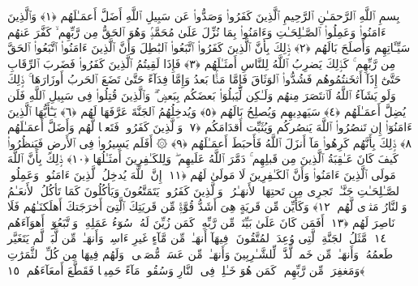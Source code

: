 
  
    
  
    
    

\nopagebreak
  بِسمِ ٱللَّهِ ٱلرَّحمَـٰنِ ٱلرَّحِيمِ
  ٱلَّذِينَ كَفَرُوا۟ وَصَدُّوا۟ عَن سَبِيلِ ٱللَّهِ أَضَلَّ أَعمَـٰلَهُم ﴿١﴾
 وَٱلَّذِينَ ءَامَنُوا۟ وَعَمِلُوا۟ ٱلصَّـٰلِحَـٰتِ وَءَامَنُوا۟ بِمَا نُزِّلَ عَلَىٰ مُحَمَّدٍۢ وَهُوَ ٱلحَقُّ مِن رَّبِّهِم ۙ كَفَّرَ عَنهُم سَيِّـَٔاتِهِم وَأَصلَحَ بَالَهُم ﴿٢﴾
 ذَٟلِكَ بِأَنَّ ٱلَّذِينَ كَفَرُوا۟ ٱتَّبَعُوا۟ ٱلبَٰطِلَ وَأَنَّ ٱلَّذِينَ ءَامَنُوا۟ ٱتَّبَعُوا۟ ٱلحَقَّ مِن رَّبِّهِم ۚ كَذَٟلِكَ يَضرِبُ ٱللَّهُ لِلنَّاسِ أَمثَـٰلَهُم ﴿٣﴾
 فَإِذَا لَقِيتُمُ ٱلَّذِينَ كَفَرُوا۟ فَضَربَ ٱلرِّقَابِ حَتَّىٰٓ إِذَآ أَثخَنتُمُوهُم فَشُدُّوا۟ ٱلوَثَاقَ فَإِمَّا مَنًّۢا بَعدُ وَإِمَّا فِدَآءً حَتَّىٰ تَضَعَ ٱلحَربُ أَوزَارَهَا ۚ ذَٟلِكَ وَلَو يَشَآءُ ٱللَّهُ لَٱنتَصَرَ مِنهُم وَلَـٰكِن لِّيَبلُوَا۟ بَعضَكُم بِبَعضٍۢ ۗ وَٱلَّذِينَ قُتِلُوا۟ فِى سَبِيلِ ٱللَّهِ فَلَن يُضِلَّ أَعمَـٰلَهُم ﴿٤﴾
 سَيَهدِيهِم وَيُصلِحُ بَالَهُم ﴿٥﴾
 وَيُدخِلُهُمُ ٱلجَنَّةَ عَرَّفَهَا لَهُم ﴿٦﴾
 يَـٰٓأَيُّهَا ٱلَّذِينَ ءَامَنُوٓا۟ إِن تَنصُرُوا۟ ٱللَّهَ يَنصُركُم وَيُثَبِّت أَقدَامَكُم ﴿٧﴾
 وَٱلَّذِينَ كَفَرُوا۟ فَتَعسًۭا لَّهُم وَأَضَلَّ أَعمَـٰلَهُم ﴿٨﴾
 ذَٟلِكَ بِأَنَّهُم كَرِهُوا۟ مَآ أَنزَلَ ٱللَّهُ فَأَحبَطَ أَعمَـٰلَهُم ﴿٩﴾
 ۞ أَفَلَم يَسِيرُوا۟ فِى ٱلأَرضِ فَيَنظُرُوا۟ كَيفَ كَانَ عَـٰقِبَةُ ٱلَّذِينَ مِن قَبلِهِم ۚ دَمَّرَ ٱللَّهُ عَلَيهِم ۖ وَلِلكَـٰفِرِينَ أَمثَـٰلُهَا ﴿١٠﴾
 ذَٟلِكَ بِأَنَّ ٱللَّهَ مَولَى ٱلَّذِينَ ءَامَنُوا۟ وَأَنَّ ٱلكَـٰفِرِينَ لَا مَولَىٰ لَهُم ﴿١١﴾
 إِنَّ ٱللَّهَ يُدخِلُ ٱلَّذِينَ ءَامَنُوا۟ وَعَمِلُوا۟ ٱلصَّـٰلِحَـٰتِ جَنَّـٰتٍۢ تَجرِى مِن تَحتِهَا ٱلأَنهَـٰرُ ۖ وَٱلَّذِينَ كَفَرُوا۟ يَتَمَتَّعُونَ وَيَأكُلُونَ كَمَا تَأكُلُ ٱلأَنعَـٰمُ وَٱلنَّارُ مَثوًۭى لَّهُم ﴿١٢﴾
 وَكَأَيِّن مِّن قَريَةٍ هِىَ أَشَدُّ قُوَّةًۭ مِّن قَريَتِكَ ٱلَّتِىٓ أَخرَجَتكَ أَهلَكنَـٰهُم فَلَا نَاصِرَ لَهُم ﴿١٣﴾
 أَفَمَن كَانَ عَلَىٰ بَيِّنَةٍۢ مِّن رَّبِّهِۦ كَمَن زُيِّنَ لَهُۥ سُوٓءُ عَمَلِهِۦ وَٱتَّبَعُوٓا۟ أَهوَآءَهُم ﴿١٤﴾
 مَّثَلُ ٱلجَنَّةِ ٱلَّتِى وُعِدَ ٱلمُتَّقُونَ ۖ فِيهَآ أَنهَـٰرٌۭ مِّن مَّآءٍ غَيرِ ءَاسِنٍۢ وَأَنهَـٰرٌۭ مِّن لَّبَنٍۢ لَّم يَتَغَيَّر طَعمُهُۥ وَأَنهَـٰرٌۭ مِّن خَمرٍۢ لَّذَّةٍۢ لِّلشَّـٰرِبِينَ وَأَنهَـٰرٌۭ مِّن عَسَلٍۢ مُّصَفًّۭى ۖ وَلَهُم فِيهَا مِن كُلِّ ٱلثَّمَرَٰتِ وَمَغفِرَةٌۭ مِّن رَّبِّهِم ۖ كَمَن هُوَ خَـٰلِدٌۭ فِى ٱلنَّارِ وَسُقُوا۟ مَآءً حَمِيمًۭا فَقَطَّعَ أَمعَآءَهُم ﴿١٥﴾
